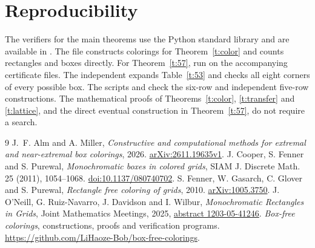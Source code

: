 \documentclass[11pt]{article}
\begin{document}
\section*{Reproducibility}
The verifiers for the main theorems use the Python standard library and are available in \cite{data}. The file  constructs colorings for Theorem~\ref{t:color} and counts rectangles and boxes directly. For Theorem~\ref{t:57}, run  on the accompanying certificate files. The independent  expands Table~\ref{t:53} and checks all eight corners of every possible box. The scripts  and  check the six-row and independent five-row constructions. The mathematical proofs of Theorems~\ref{t:color}, \ref{t:transfer} and \ref{t:lattice}, and the direct eventual construction in Theorem~\ref{t:57}, do not require a search.

\begin{thebibliography}{9}
 J.~F. Alm and A. Miller, \emph{Constructive and computational methods for extremal and near-extremal box colorings}, 2026. \href{https://arxiv.org/abs/2611.19635}{arXiv:2611.19635v1}.
 J. Cooper, S. Fenner and S. Purewal, \emph{Monochromatic boxes in colored grids}, SIAM J. Discrete Math. 25 (2011), 1054--1068. \href{https://doi.org/10.1137/080740702}{doi:10.1137/080740702}.
 S. Fenner, W. Gasarch, C. Glover and S. Purewal, \emph{Rectangle free coloring of grids}, 2010. \href{https://arxiv.org/abs/1005.3750}{arXiv:1005.3750}.
 J. O'Neill, G. Ruiz-Navarro, J. Davidson and I. Wilbur, \emph{Monochromatic Rectangles in Grids}, Joint Mathematics Meetings, 2025, \href{https://meetings.ams.org/math/jmm2025/meetingapp.cgi/Paper/41246}{abstract 1203-05-41246}.
 \emph{Box-free colorings}, constructions, proofs and verification programs. \url{https://github.com/LiHaoze-Bob/box-free-colorings}.
\end{thebibliography}
\end{document}
